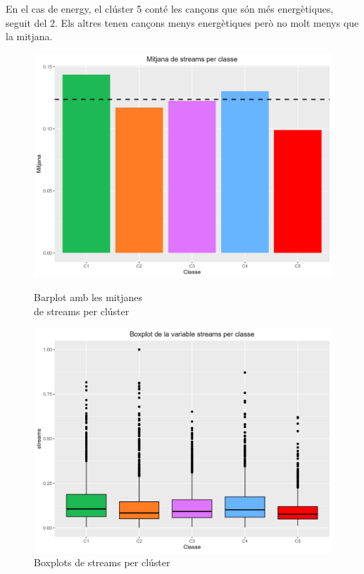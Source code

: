 \documentclass{article}
\begin{document}
En el cas de energy, el clúster 5 conté les cançons que són més energètiques, seguit del 2. Els altres tenen cançons menys energètiques però no molt menys que la mitjana. 
\begin{figure}[H]
\centering
    \begin{minipage}{.49\textwidth}
        \centering
        \includegraphics[width=0.95\linewidth]{Images/5_Profiling/numeriques/Num_BarPlot_streams.png}
        \caption{Barplot amb les mitjanes \\ de streams per clúster}
        \label{fig:Num_BarPlot_streams}
    \end{minipage}%
    \begin{minipage}{.49\textwidth}
        \centering
        \includegraphics[width=0.95\linewidth]{Images/5_Profiling/numeriques/Num_BoxPlot_streams.png}
        \caption{Boxplots de streams per clúster}
        \label{fig:Num_BoxPlot_streams}
    \end{minipage}%
\end{figure}
\end{document}
